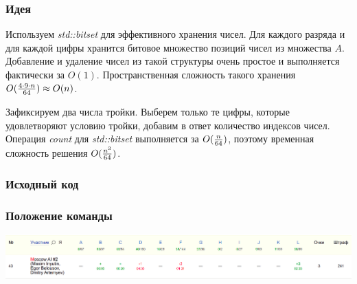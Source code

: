 \documentclass[12pt]{article}
\begin{document}

\subsubsection*{Идея}
Используем \textit{std::bitset} для эффективного хранения чисел. Для каждого разряда и для каждой цифры хранится битовое множество позиций чисел из множества $A$. Добавление и удаление чисел из такой структуры очень простое и выполняется фактически за $O(1)$. Пространственная сложность такого хранения $O({{4 \cdot 9 \cdot n}\over{64}}) \approx O(n)$.

Зафиксируем два числа тройки. Выберем только те цифры, которые удовлетворяют условию тройки, добавим в ответ количество индексов чисел. Операция \textit{count} для \textit{std::bitset} выполняется за $O({n \over 64})$, поэтому временная сложность решения $O({{n ^ 3} \over 64})$.
\subsubsection*{Исходный код}

\subsubsection*{Положение команды}
\includegraphics[scale=0.25]{images/mw4.png}\newline\noindent
\pagebreak


\end{document}

